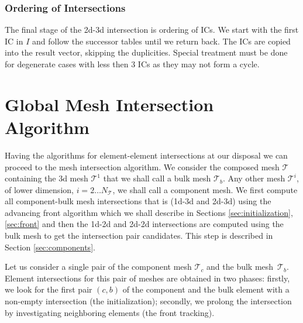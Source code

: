 \subsubsection{Ordering of Intersections}
\label{sec:ordering}
The final stage of the 2d-3d intersection is ordering of ICs. We start with the first IC in $I$ and follow the 
successor tables until we return back. The ICs are copied into the result vector, skipping the duplicities.
Special treatment must be done for degenerate cases with less then $3$ ICs as they may not form a cycle.
  

\section{Global Mesh Intersection Algorithm}
\label{sec:front_advancing}
Having the algorithms for element-element intersections at our disposal we can proceed to the mesh intersection algorithm. 
We consider the composed mesh $\mathcal T$ containing the 3d mesh $\mathcal T^1$ that we shall call a bulk mesh $\mathcal T_b$. Any other 
mesh $\mathcal T^i$, of lower dimension, $i=2\dots N_{\mathcal T}$, we shall call a component mesh. 
We first compute all component-bulk mesh intersections that is (1d-3d and 2d-3d) using the advancing front algorithm which we shall describe in Sections 
\ref{sec:initialization}, \ref{sec:front} and then the 1d-2d and 2d-2d 
intersections are computed using the bulk mesh to get the intersection pair candidates. This step is described in Section \ref{sec:components}.

Let us consider a single pair of the component mesh $\mathcal T_c$ and the bulk mesh~$\mathcal T_b$. 
Element intersections for this pair of meshes are obtained in two phases: firstly, we look for the 
first pair $(c,b)$ of the component and the bulk element with a non-empty intersection (the initialization); 
secondly, we prolong the intersection by investigating neighboring elements (the front tracking).



